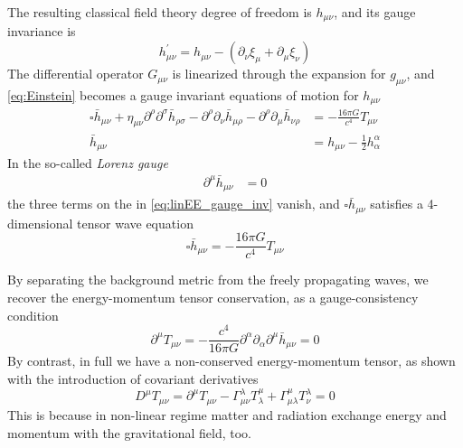 The resulting classical field theory degree of freedom is $h_{\mu\nu}$, and its gauge invariance is
\begin{equation}
	h_{\mu\nu}^{\prime}=h_{\mu\nu}-\left(\partial_{\nu}\xi_{\mu}+\partial_{\mu}\xi_{\nu}\right)\label{eq:h_gauge_invariance}
\end{equation}
The differential operator $G_{\mu\nu}$ is linearized through the expansion for $g_{\mu\nu}$, and \eqref{eq:Einstein} becomes a gauge invariant equations of motion for $h_{\mu\nu}$
\begin{align}
	\square\bar{h}_{\mu\nu}+\eta_{\mu\nu}\partial^{\rho}\partial^{\sigma}\bar{h}_{\rho\sigma}-\partial^{\rho}\partial_{\nu}\bar{h}_{\mu\rho}-\partial^{\rho}\partial_{\mu}\bar{h}_{\nu\rho} & =-\frac{16\pi G}{c^{4}}T_{\mu\nu}\label{eq:linEE_gauge_inv}\\
	\bar{h}_{\mu\nu} & =h_{\mu\nu}-\frac{1}{2}h_{\alpha}^{\alpha} 
\end{align}
In the so-called \emph{Lorenz gauge}
\begin{align}
	\partial^{\mu}\bar{h}_{\mu\nu} & =0\label{eq:Lorenz-gauge}
\end{align}
the three terms on the \lhs in \eqref{eq:linEE_gauge_inv} vanish, and $\square\bar{h}_{\mu\nu}$ satisfies a 4-dimensional tensor wave equation
\begin{equation}
	\square\bar{h}_{\mu\nu}=-\frac{16\pi G}{c^{4}}T_{\mu\nu}\label{eq:linear-EE}
\end{equation}

By separating the background metric from the freely propagating waves, we recover the energy-momentum tensor conservation, as a gauge-consistency condition 
\begin{equation}
	\partial^{\mu}T_{\mu\nu}=-\frac{c^{4}}{16\pi G}\partial^{\alpha}\partial_{\alpha}\partial^{\mu}\bar{h}_{\mu\nu}=0\label{eq:conservedTmunu}
\end{equation}
By contrast, in full \gr we have a non-conserved energy-momentum
tensor, as shown with the introduction of covariant derivatives 
\begin{equation}
	 D^{\mu}T_{\mu\nu} =\partial^{\mu}T_{\mu\nu}-\Gamma_{\mu\nu}^{\lambda}T_{\lambda}^{\mu}+\Gamma_{\mu\lambda}^{\mu}T_{\nu}^{\lambda}=0
\end{equation}
This is because in non-linear regime matter and radiation exchange energy and momentum with the gravitational field, too.


